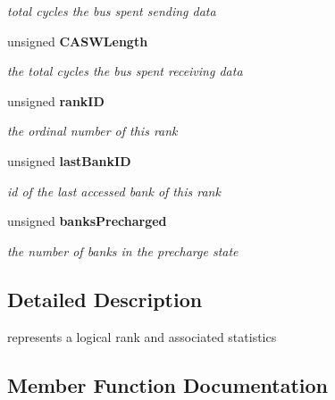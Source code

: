 \begin{CompactItemize}
\begin{CompactList}\small\item\em total cycles the bus spent sending data \item\end{CompactList}\item 
unsigned {\bf CASWLength}\label{class_d_r_a_msim_i_i_1_1_rank_b86c1fae4862cef50536b50b5cc3723f}

\begin{CompactList}\small\item\em the total cycles the bus spent receiving data \item\end{CompactList}\item 
unsigned {\bf rankID}\label{class_d_r_a_msim_i_i_1_1_rank_ffbf67886f2bc55eaf601710c63f5152}

\begin{CompactList}\small\item\em the ordinal number of this rank \item\end{CompactList}\item 
unsigned {\bf lastBankID}\label{class_d_r_a_msim_i_i_1_1_rank_0180a5d1ab8f4ba541caa7409ab5b533}

\begin{CompactList}\small\item\em id of the last accessed bank of this rank \item\end{CompactList}\item 
unsigned {\bf banksPrecharged}\label{class_d_r_a_msim_i_i_1_1_rank_86ddad92c9314e053da64c8d9ae89f46}

\begin{CompactList}\small\item\em the number of banks in the precharge state \item\end{CompactList}\end{CompactItemize}


\subsection{Detailed Description}
represents a logical rank and associated statistics 

\subsection{Member Function Documentation}
